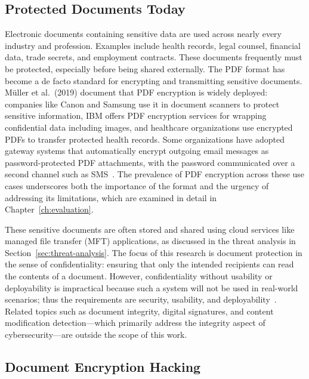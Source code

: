 \subsection{Protected Documents Today}
\label{sec:doc-today}

Electronic documents containing sensitive data are used across nearly every industry and profession. Examples include health records, legal counsel, financial data, trade secrets, and employment contracts. These documents frequently must be protected, especially before being shared externally. The PDF format has become a de facto standard for encrypting and transmitting sensitive documents. M\"uller et al.\ (2019) document that PDF encryption is widely deployed: companies like Canon and Samsung use it in document scanners to protect sensitive information, IBM offers PDF encryption services for wrapping confidential data including images, and healthcare organizations use encrypted PDFs to transfer protected health records. Some organizations have adopted gateway systems that automatically encrypt outgoing email messages as password-protected PDF attachments, with the password communicated over a second channel such as SMS~\cite{muller_practical_2019}. The prevalence of PDF encryption across these use cases underscores both the importance of the format and the urgency of addressing its limitations, which are examined in detail in Chapter~\ref{ch:evaluation}.

These sensitive documents are often stored and shared using cloud services like managed file transfer (MFT) applications, as discussed in the threat analysis in Section~\ref{sec:threat-analysis}. The focus of this research is document protection in the sense of confidentiality: ensuring that only the intended recipients can read the contents of a document. However, confidentiality without usability or deployability is impractical because such a system will not be used in real-world scenarios; thus the requirements are security, usability, and deployability~\cite{bonneau_quest_2012,borisov_sok_2021}. Related topics such as document integrity, digital signatures, and content modification detection---which primarily address the integrity aspect of cybersecurity---are outside the scope of this work.

\subsection{Document Encryption Hacking}
\label{sec:doc-hacking}

